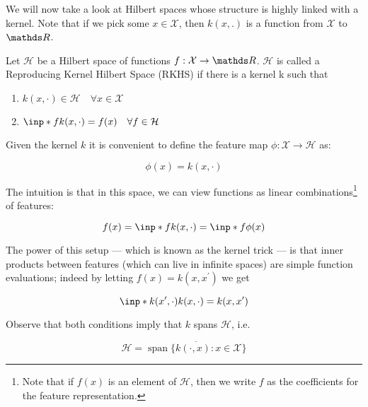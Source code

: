 


We will now take a look at Hilbert spaces whose structure is highly linked with a kernel. 
Note that if we pick some $x \in \mathcal{X}$, then $k(x, .)$ is a function from $\mathcal{X}$ to $\R$.

\begin{definition}
    Let $\mathcal{H}$ be a Hilbert space of functions $f: \mathcal{X} \rightarrow \R$. 
    $\mathcal{H}$ is called a Reproducing Kernel Hilbert Space (RKHS) if there is a kernel k such that

    \begin{enumerate}
        \item $ k(x, \cdot) \in \mathcal{H} \quad \forall x \in \mathcal{X}$
        \item $ \inp*{f}{k(x, \cdot)} = f(x) \quad \forall f \in \mathcal{H}$
    \end{enumerate}

\end{definition}

Given the kernel $k$ it is convenient to define the feature map $\phi: \mathcal{X} \rightarrow \mathcal{H}$ as:

$$
    \phi(x) = k(x, \cdot)
$$

The intuition is that in this space, we can view functions as linear combinations\footnote{
    Note that if $f(x)$ is an element of $\mathcal{H}$, then we write $f$ as the coefficients
    for the feature representation. 
} of features:

$$
    f(x) =  \inp*{f}{k(x, \cdot)} = \inp*{f}{\phi(x)}
$$


The power of this setup --- which is known as the kernel trick --- is that inner products between
features (which can live in infinite spaces) are simple function evaluations; 
indeed by letting $f(x) = k(x, x^\prime)$ we get

$$
    \inp*{k(x^\prime, \cdot)}{k(x, \cdot)} = k(x, x^\prime)
$$

Observe that both conditions imply that $k$ spans $\mathcal{H}$, i.e.

\begin{equation}
    \mathcal{H}=\overline{\operatorname{span}\{k(\cdot, x): x \in \mathcal{X}\}}
\end{equation}

